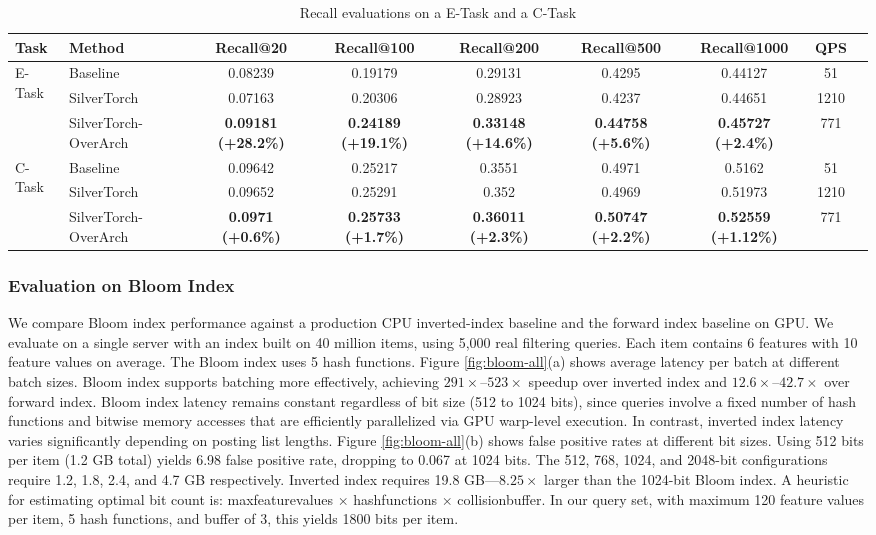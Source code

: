 \begin{table}[ht]
    \centering
    \small
    \begin{tabular}{llccccccc}
    \toprule
    \textbf{Task} & \textbf{Method} & \textbf{Recall@20} & \textbf{Recall@100} & \textbf{Recall@200} & \textbf{Recall@500} & \textbf{Recall@1000} & \textbf{QPS} \\
    \midrule
    \multirow{3}{*}{E-Task} 
        & Baseline & 0.08239 & 0.19179 & 0.29131 & 0.4295 & 0.44127 & 51 \\ 
        & SilverTorch & 0.07163 & 0.20306 & 0.28923 & 0.4237 & 0.44651 & 1210 \\ 
        & SilverTorch-OverArch & \textbf{0.09181 (+28.2\%)} & \textbf{0.24189 (+19.1\%)} & \textbf{0.33148 (+14.6\%)} & \textbf{0.44758 (+5.6\%)} & \textbf{0.45727 (+2.4\%)} & 771 \\ 
    \midrule
    \multirow{3}{*}{C-Task} 
        & Baseline & 0.09642 & 0.25217 & 0.3551 & 0.4971 & 0.5162 & 51 \\ 
        & SilverTorch & 0.09652 & 0.25291 & 0.352 & 0.4969 & 0.51973 & 1210 \\ 
        & SilverTorch-OverArch & \textbf{0.0971 (+0.6\%)} & \textbf{0.25733 (+1.7\%)} & \textbf{0.36011 (+2.3\%)} & \textbf{0.50747 (+2.2\%)} & \textbf{0.52559 (+1.12\%)} & 771 \\ 
    \bottomrule
    \end{tabular}
    \caption{Recall evaluations on a E-Task and a C-Task}
    \label{tab:recall-overarch}
\end{table}

\subsubsection{Evaluation on Bloom Index}
We compare Bloom index performance against a production CPU inverted-index baseline and the forward index baseline on GPU. We evaluate on a single server with an index built on 40 million items, using 5,000 real filtering queries. Each item contains 6 features with 10 feature values on average. The Bloom index uses 5 hash functions.
Figure \ref{fig:bloom-all}(a) shows average latency per batch at different batch sizes. Bloom index supports batching more effectively, achieving $291\times$–$523\times$ speedup over inverted index and $12.6\times$–$42.7\times$ over forward index. Bloom index latency remains constant regardless of bit size (512 to 1024 bits), since queries involve a fixed number of hash functions and bitwise memory accesses that are efficiently parallelized via GPU warp-level execution. In contrast, inverted index latency varies significantly depending on posting list lengths.
Figure \ref{fig:bloom-all}(b) shows false positive rates at different bit sizes. Using 512 bits per item (1.2 GB total) yields 6.98 false positive rate, dropping to 0.067 at 1024 bits. The 512, 768, 1024, and 2048-bit configurations require 1.2, 1.8, 2.4, and 4.7 GB respectively. Inverted index requires 19.8 GB—$8.25\times$ larger than the 1024-bit Bloom index.
A heuristic for estimating optimal bit count is: maxfeaturevalues $\times$ hashfunctions $\times$ collisionbuffer. In our query set, with maximum 120 feature values per item, 5 hash functions, and buffer of 3, this yields 1800 bits per item.

